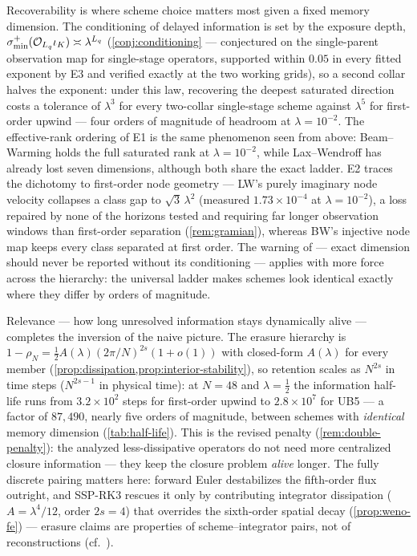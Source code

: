 \documentclass[pdflatex,sn-mathphys-num]{sn-jnl}%
\theoremstyle{thmstyleone}%
\theoremstyle{thmstyletwo}%
\theoremstyle{thmstylethree}%
\begin{document}
Recoverability is where scheme choice matters most given a fixed memory dimension.
The conditioning of delayed information is set by the exposure depth, $\sigma^{+}_{\min}({\cal O}_{L_q}\iota_K)\asymp\lambda^{L_q}$ (\cref{conj:conditioning} --- conjectured on the single-parent observation map for single-stage operators, supported within $0.05$ in every fitted exponent by E3 and verified exactly at the two working grids), so a second collar halves the exponent: under this law, recovering the deepest saturated direction costs a tolerance of $\lambda^{3}$ for every two-collar single-stage scheme against $\lambda^{5}$ for first-order upwind --- four orders of magnitude of headroom at $\lambda=10^{-2}$.
The effective-rank ordering of E1 is the same phenomenon seen from above: Beam--Warming holds the full saturated rank at $\lambda=10^{-2}$, while Lax--Wendroff has already lost seven dimensions, although both share the exact ladder.
E2 traces the dichotomy to first-order node geometry --- LW's purely imaginary node velocity collapses a class gap to $\sqrt3\,\lambda^2$ (measured $1.73\times10^{-4}$ at $\lambda=10^{-2}$), a loss repaired by none of the horizons tested and requiring far longer observation windows than first-order separation (\cref{rem:gramian}), whereas BW's injective node map keeps every class separated at first order.
The warning of \cite{PolemitisChristakisDrikakis2026FVerasure} --- exact dimension should never be reported without its conditioning --- applies with more force across the hierarchy: the universal ladder makes schemes look identical exactly where they differ by orders of magnitude.

Relevance --- how long unresolved information stays dynamically alive --- completes the inversion of the naive picture.
The erasure hierarchy is $1-\rho_N=\tfrac12A(\lambda)(2\pi/N)^{2s}(1+o(1))$ with closed-form $A(\lambda)$ for every member (\cref{prop:dissipation,prop:interior-stability}), so retention scales as $N^{2s}$ in time steps ($N^{2s-1}$ in physical time): at $N=48$ and $\lambda=\tfrac12$ the information half-life runs from $3.2\times10^2$ steps for first-order upwind to $2.8\times10^7$ for UB5 --- a factor of $87{,}490$, nearly five orders of magnitude, between schemes with \emph{identical} memory dimension (\cref{tab:half-life}).
This is the revised penalty (\cref{rem:double-penalty}): the analyzed less-dissipative operators do not need more centralized closure information --- they keep the closure problem \emph{alive} longer.
The fully discrete pairing matters here: forward Euler destabilizes the fifth-order flux outright, and SSP-RK3 rescues it only by contributing integrator dissipation ($A=\lambda^4/12$, order $2s=4$) that overrides the sixth-order spatial decay (\cref{prop:weno-fe}) --- erasure claims are properties of scheme--integrator pairs, not of reconstructions (cf.\ \cite{PolemitisChristakisDrikakis2026onestep}).
\end{document}
